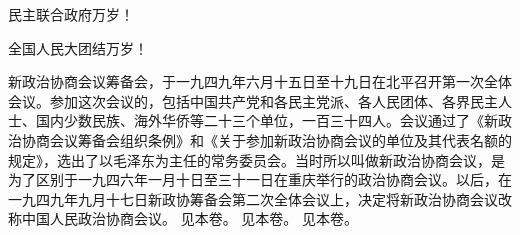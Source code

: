 民主联合政府万岁！

全国人民大团结万岁！


\begin{maonote}
新政治协商会议筹备会，于一九四九年六月十五日至十九日在北平召开第一次全体会议。参加这次会议的，包括中国共产党和各民主党派、各人民团体、各界民主人士、国内少数民族、海外华侨等二十三个单位，一百三十四人。会议通过了《新政治协商会议筹备会组织条例》和《关于参加新政治协商会议的单位及其代表名额的规定》，选出了以毛泽东为主任的常务委员会。当时所以叫做新政治协商会议，是为了区别于一九四六年一月十日至三十一日在重庆举行的政治协商会议。以后，在一九四九年九月十七日新政协筹备会第二次全体会议上，决定将新政治协商会议改称中国人民政治协商会议。
见本卷。
见本卷。
见本卷。
\end{maonote}
